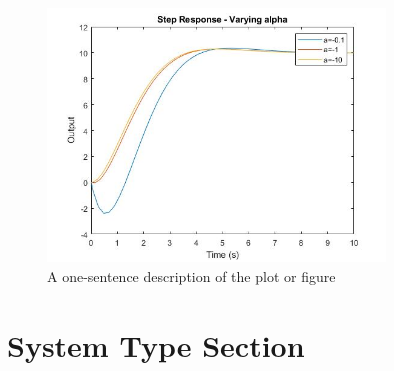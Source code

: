 \begin{figure}[H]
        \centering
        \includegraphics[width=0.8\textwidth]{./figures/lab4_fig4-part4-3-2-negative.jpg} %
        \caption{A one-sentence description of the plot or figure}
        \label{fig:name} %
\end{figure}

\section{System Type Section} %


